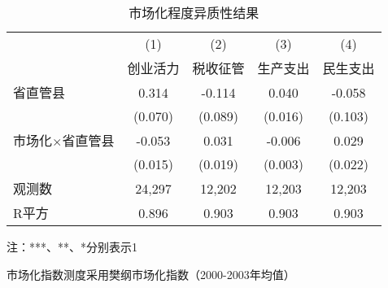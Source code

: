 \begin{table}[!htbp]
\footnotesize
\centering
\caption{市场化程度异质性结果}\label{tab:hetero_market}
\begin{threeparttable}
\begin{tabular}{lcccc}
\toprule
 & (1) & (2) & (3) & (4) \\
 & 创业活力 & 税收征管 & 生产支出 & 民生支出 \\
\midrule
省直管县 & 0.314\tnote{***} & -0.114 & 0.040\tnote{*} & -0.058 \\
 & (0.070) & (0.089) & (0.016) & (0.103) \\
市场化$\times$省直管县 & -0.053\tnote{**} & 0.031 & -0.006 & 0.029 \\
 & (0.015) & (0.019) & (0.003) & (0.022) \\
\addlinespace[0.5ex]
观测数 & 24,297 & 12,202 & 12,203 & 12,203 \\
R平方 & 0.896 & 0.903 & 0.903 & 0.903 \\
\bottomrule
\end{tabular}

\begin{tablenotes}
\scriptsize
\item 注：***、**、*分别表示1%
\item 市场化指数测度采用樊纲市场化指数（2000-2003年均值）
\end{tablenotes}
\end{threeparttable}
\end{table}
